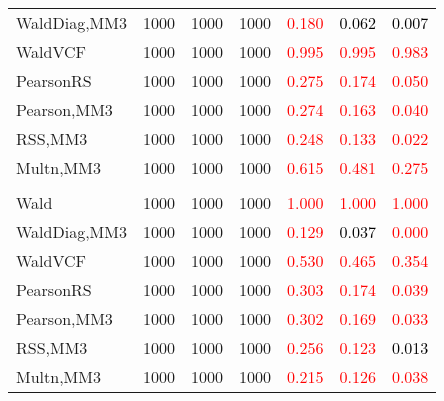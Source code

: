 \documentclass[
]{article}
\begin{document}
\begin{table}[H]
{\begin{tabular}[t]{lrrrrrr}
\hspace{1em}WaldDiag,MM3 & 1000 & 1000 & 1000 & \textcolor{red}{0.180} & \textcolor{black}{0.062} & \textcolor{black}{0.007}\\
\hspace{1em}WaldVCF & 1000 & 1000 & 1000 & \textcolor{red}{0.995} & \textcolor{red}{0.995} & \textcolor{red}{0.983}\\
\hspace{1em}PearsonRS & 1000 & 1000 & 1000 & \textcolor{red}{0.275} & \textcolor{red}{0.174} & \textcolor{red}{0.050}\\
\hspace{1em}Pearson,MM3 & 1000 & 1000 & 1000 & \textcolor{red}{0.274} & \textcolor{red}{0.163} & \textcolor{red}{0.040}\\
\hspace{1em}RSS,MM3 & 1000 & 1000 & 1000 & \textcolor{red}{0.248} & \textcolor{red}{0.133} & \textcolor{red}{0.022}\\
\hspace{1em}Multn,MM3 & 1000 & 1000 & 1000 & \textcolor{red}{0.615} & \textcolor{red}{0.481} & \textcolor{red}{0.275}\\
\addlinespace[0.3em]
\multicolumn{7}{l}{\textbf{3F 15V}}\\
\hspace{1em}Wald & 1000 & 1000 & 1000 & \textcolor{red}{1.000} & \textcolor{red}{1.000} & \textcolor{red}{1.000}\\
\hspace{1em}WaldDiag,MM3 & 1000 & 1000 & 1000 & \textcolor{red}{0.129} & \textcolor{black}{0.037} & \textcolor{red}{0.000}\\
\hspace{1em}WaldVCF & 1000 & 1000 & 1000 & \textcolor{red}{0.530} & \textcolor{red}{0.465} & \textcolor{red}{0.354}\\
\hspace{1em}PearsonRS & 1000 & 1000 & 1000 & \textcolor{red}{0.303} & \textcolor{red}{0.174} & \textcolor{red}{0.039}\\
\hspace{1em}Pearson,MM3 & 1000 & 1000 & 1000 & \textcolor{red}{0.302} & \textcolor{red}{0.169} & \textcolor{red}{0.033}\\
\hspace{1em}RSS,MM3 & 1000 & 1000 & 1000 & \textcolor{red}{0.256} & \textcolor{red}{0.123} & \textcolor{black}{0.013}\\
\hspace{1em}Multn,MM3 & 1000 & 1000 & 1000 & \textcolor{red}{0.215} & \textcolor{red}{0.126} & \textcolor{red}{0.038}\\
\bottomrule
\end{tabular}}
\endgroup{}
\end{table}
\end{document}
